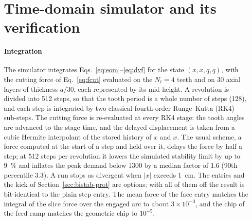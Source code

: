 \section{Time-domain simulator and its verification}\label{app:simulator}

\paragraph{Integration}
The simulator integrates Eqs.~\eqref{eq:eom}--\eqref{eq:dvf} for the state $(x,\dot x,q,\dot q)$, with the cutting force of Eq.~\eqref{eq:fcut} evaluated on the $N_t=4$ teeth and on 30 axial layers of thickness $a/30$, each represented by its mid-height. A revolution is divided into 512 steps, so that the tooth period is a whole number of steps (128), and each step is integrated by two classical fourth-order Runge--Kutta (RK4) sub-steps. The cutting force is re-evaluated at every RK4 stage: the tooth angles are advanced to the stage time, and the delayed displacement is taken from a cubic Hermite interpolant of the stored history of $x$ and $\dot x$. The usual scheme, a force computed at the start of a step and held over it, delays the force by half a step; at 512 steps per revolution it lowers the simulated stability limit by up to \SI{9}{\percent} and inflates the peak demand below \SI{1300}{\rpm} by a median factor of 1.6 (90th percentile 3.3). A run stops as divergent when $\lvert x\rvert$ exceeds \SI{1}{\centi\metre}. The entries and the kick of Section~\ref{sec:bistab-prot} are options; with all of them off the result is bit-identical to the plain step entry. The mean force of the face entry matches the integral of the slice force over the engaged arc to about $3\times10^{-3}$, and the chip of the feed ramp matches the geometric chip to $10^{-5}$.

